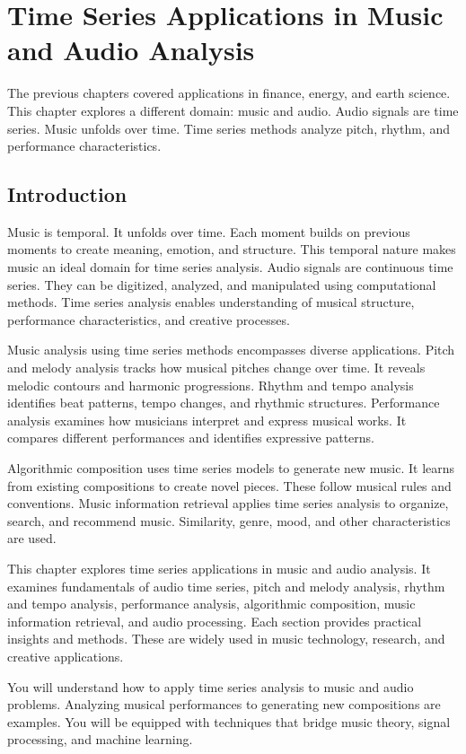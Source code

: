\chapter{Time Series Applications in Music and Audio Analysis}

The previous chapters covered applications in finance, energy, and earth science. This chapter explores a different domain: music and audio. Audio signals are time series. Music unfolds over time. Time series methods analyze pitch, rhythm, and performance characteristics.

\section{Introduction}

Music is temporal. It unfolds over time. Each moment builds on previous moments to create meaning, emotion, and structure. This temporal nature makes music an ideal domain for time series analysis. Audio signals are continuous time series. They can be digitized, analyzed, and manipulated using computational methods. Time series analysis enables understanding of musical structure, performance characteristics, and creative processes.

Music analysis using time series methods encompasses diverse applications. Pitch and melody analysis tracks how musical pitches change over time. It reveals melodic contours and harmonic progressions. Rhythm and tempo analysis identifies beat patterns, tempo changes, and rhythmic structures. Performance analysis examines how musicians interpret and express musical works. It compares different performances and identifies expressive patterns.

Algorithmic composition uses time series models to generate new music. It learns from existing compositions to create novel pieces. These follow musical rules and conventions. Music information retrieval applies time series analysis to organize, search, and recommend music. Similarity, genre, mood, and other characteristics are used.

This chapter explores time series applications in music and audio analysis. It examines fundamentals of audio time series, pitch and melody analysis, rhythm and tempo analysis, performance analysis, algorithmic composition, music information retrieval, and audio processing. Each section provides practical insights and methods. These are widely used in music technology, research, and creative applications.

You will understand how to apply time series analysis to music and audio problems. Analyzing musical performances to generating new compositions are examples. You will be equipped with techniques that bridge music theory, signal processing, and machine learning.

